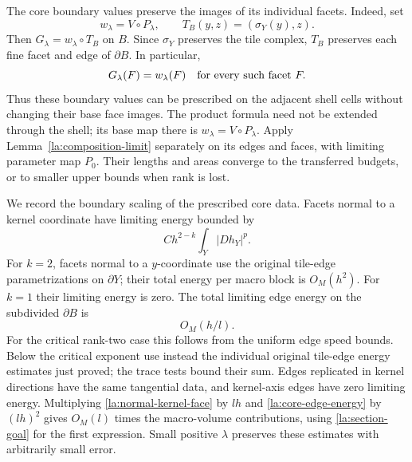 The core boundary values preserve the images of its individual facets.
Indeed, set
\[
 w_\lambda=V\circ P_\lambda,\qquad
 T_B(y,z)=(\sigma_Y(y),z).
\]
Then $G_\lambda=w_\lambda\circ T_B$ on $B$.  Since $\sigma_Y$ preserves
the tile complex, $T_B$ preserves each fine facet and edge of
$\partial B$.  In particular,
\[
 G_\lambda(F)=w_\lambda(F)
 \quad\hbox{for every such facet }F.
\]
Thus these boundary values can be prescribed on the adjacent shell
cells without changing their base face images.  The product formula
need not be extended through the shell; its base map there is
$w_\lambda=V\circ P_\lambda$.
Apply Lemma~\ref{la:composition-limit} separately on its edges and
faces, with limiting parameter map $P_0$.  Their lengths and areas
converge to the transferred budgets, or to smaller upper bounds
when rank is lost.

We record the boundary scaling of the prescribed core data.  Facets
normal to a kernel coordinate have limiting energy bounded by
\begin{equation}\label{la:normal-kernel-face}
 C h^{2-k}\int_Y|Dh_Y|^p.
\end{equation}
For $k=2$, facets normal to a $y$-coordinate use the original tile-edge
parametrizations on $\partial Y$; their total energy per macro block
is $O_M(h^2)$.  For $k=1$ their limiting energy is zero.  The total
limiting edge energy on the subdivided $\partial B$ is
\begin{equation}\label{la:core-edge-energy}
 O_M(h/l).
\end{equation}
For the critical rank-two case this follows from the uniform edge
speed bounds.  Below the critical exponent use instead the
individual original tile-edge energy estimates just proved; the
trace tests bound their sum.  Edges replicated in kernel directions
have the same tangential data, and kernel-axis edges have zero
limiting energy.  Multiplying \eqref{la:normal-kernel-face} by $lh$
and \eqref{la:core-edge-energy} by $(lh)^2$ gives
$O_M(l)$ times the macro-volume contributions, using
\eqref{la:section-goal} for the first expression.  Small positive
$\lambda$ preserves these estimates with arbitrarily small error.

